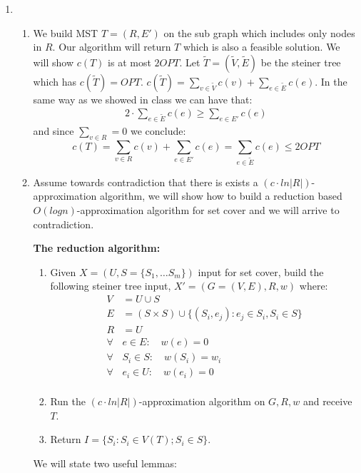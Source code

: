 \documentclass{article}
\begin{document}
\begin{enumerate}
\item \begin{enumerate}
	\item We build MST $T = (R,E')$ on the sub graph which includes only nodes in $R$. Our algorithm will return $T$ which is also a feasible solution. We will show $c(T)$ is at most $2OPT$. Let $\tilde T=(\tilde V,\tilde E)$ be the steiner tree which has $c(\tilde T)=OPT$. $c(\tilde T) = \sum_{v\in \tilde V} c(v) + \sum_{e\in \tilde E} c(e)$. In the same way as we showed in class we can have that:
	\begin{align*}
		2 \cdot \sum_{e\in \tilde E} c(e) \ge \sum_{e\in E'} c(e)
	\end{align*}
	 and since $\sum_{v\in R} = 0$ we conclude:
	 $$c(T) = \sum_{v\in R} c(v) + \sum_{e\in E'} c(e) = \sum_{e\in \tilde E} c(e) \le 2OPT$$
	\item Assume towards contradiction that there is exists a $(c\cdot ln |R|)$-approximation algorithm, we will show how to build a reduction based $O(log n)$-approximation algorithm for set cover and we will arrive to contradiction. 
	
\textbf{	The reduction algorithm:}
\begin{enumerate}
	\item
	Given $X =(U,S=\{S_1,\ldots S_m\})$ input for set cover, build the following steiner tree input, $X'=(G=(V,E),R,w)$ where:
	\begin{align*}
	V &= U \cup S\\
	E &= (S\times S) \cup \{(S_i,e_j): e_j\in S_i, S_i\in S\}\\
	R &= U\\
	\forall& e\in E:\quad w(e)=0\\
	\forall& S_i\in S:\quad w(S_i)=w_i\\
	\forall& e_i\in U:\quad w(e_i)=0\\
	\end{align*}
	\item Run the $(c\cdot ln |R|)$-approximation algorithm on $G,R,w$ and receive $T$. 
	\item Return $I = \{S_i : S_i\in V(T); S_i \in S\}$.
\end{enumerate}
We will state two useful lemmas:
		

\end{enumerate}
\end{enumerate}
\end{document}
